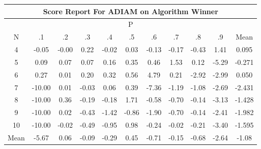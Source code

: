 \documentclass[11pt,a4paper]{report}
\begin{document}
\begin{longtable}{ | c || c | c | c | c | c | c | c | c | c || c |}
\hline
\multicolumn{11}{|c|}{ Score Report For ADIAM on Algorithm Winner} \\
\hline
\multicolumn{11}{|c|}{ P } \\
\hline
N & .1 & .2 & .3 & .4 & .5 & .6 & .7 & .8 & .9 & Mean\\
 \hline
 \hline
 \endhead
  4 &  \cellcolor[HTML]{FFFFFF} -0.05 &  \cellcolor[HTML]{FFFFFF} -0.00 &  \cellcolor[HTML]{F7F7FF} 0.22 &  \cellcolor[HTML]{FFFFFF} -0.02 &  \cellcolor[HTML]{FFFFFF} 0.03 &  \cellcolor[HTML]{FFFFFF} -0.13 &  \cellcolor[HTML]{FFF7F7} -0.17 &  \cellcolor[HTML]{FFF7F7} -0.43 &  \cellcolor[HTML]{DFDFFF} 1.41 & 0.095 \\
  5 &  \cellcolor[HTML]{FFFFFF} 0.09 &  \cellcolor[HTML]{FFFFFF} 0.07 &  \cellcolor[HTML]{FFFFFF} 0.07 &  \cellcolor[HTML]{F7F7FF} 0.16 &  \cellcolor[HTML]{F7F7FF} 0.35 &  \cellcolor[HTML]{F7F7FF} 0.46 &  \cellcolor[HTML]{D7D7FF} 1.53 &  \cellcolor[HTML]{FFFFFF} 0.12 &  \cellcolor[HTML]{FF7878} -5.29 & -0.271 \\
  6 &  \cellcolor[HTML]{F7F7FF} 0.27 &  \cellcolor[HTML]{FFFFFF} 0.01 &  \cellcolor[HTML]{F7F7FF} 0.20 &  \cellcolor[HTML]{F7F7FF} 0.32 &  \cellcolor[HTML]{EFEFFF} 0.56 &  \cellcolor[HTML]{8787FF} 4.79 &  \cellcolor[HTML]{F7F7FF} 0.21 &  \cellcolor[HTML]{FFB7B7} -2.92 &  \cellcolor[HTML]{FFB7B7} -2.99 & 0.050 \\
  7 &  \cellcolor[HTML]{FF0000} -10.00 &  \cellcolor[HTML]{FFFFFF} 0.01 &  \cellcolor[HTML]{FFFFFF} -0.03 &  \cellcolor[HTML]{FFFFFF} 0.06 &  \cellcolor[HTML]{F7F7FF} 0.39 &  \cellcolor[HTML]{FF4848} -7.36 &  \cellcolor[HTML]{FFDFDF} -1.19 &  \cellcolor[HTML]{FFE7E7} -1.08 &  \cellcolor[HTML]{FFBFBF} -2.69 & -2.431 \\
  8 &  \cellcolor[HTML]{FF0000} -10.00 &  \cellcolor[HTML]{F7F7FF} 0.36 &  \cellcolor[HTML]{FFF7F7} -0.19 &  \cellcolor[HTML]{FFF7F7} -0.18 &  \cellcolor[HTML]{D7D7FF} 1.71 &  \cellcolor[HTML]{FFEFEF} -0.58 &  \cellcolor[HTML]{FFEFEF} -0.70 &  \cellcolor[HTML]{FFFFFF} -0.14 &  \cellcolor[HTML]{FFAFAF} -3.13 & -1.428 \\
  9 &  \cellcolor[HTML]{FF0000} -10.00 &  \cellcolor[HTML]{FFFFFF} 0.02 &  \cellcolor[HTML]{FFF7F7} -0.43 &  \cellcolor[HTML]{FFDFDF} -1.42 &  \cellcolor[HTML]{FFE7E7} -0.86 &  \cellcolor[HTML]{FFCFCF} -1.90 &  \cellcolor[HTML]{FFEFEF} -0.70 &  \cellcolor[HTML]{FFFFFF} -0.14 &  \cellcolor[HTML]{FFBFBF} -2.41 & -1.982 \\
  10 &  \cellcolor[HTML]{FF0000} -10.00 &  \cellcolor[HTML]{FFFFFF} -0.02 &  \cellcolor[HTML]{FFEFEF} -0.49 &  \cellcolor[HTML]{FFE7E7} -0.95 &  \cellcolor[HTML]{E7E7FF} 0.98 &  \cellcolor[HTML]{FFF7F7} -0.24 &  \cellcolor[HTML]{FFFFFF} -0.02 &  \cellcolor[HTML]{FFF7F7} -0.21 &  \cellcolor[HTML]{FFA7A7} -3.40 & -1.595 \\
 \hline
 \hline
Mean &  \cellcolor[HTML]{FF7070} -5.67 &  \cellcolor[HTML]{FFFFFF} 0.06 &  \cellcolor[HTML]{FFFFFF} -0.09 &  \cellcolor[HTML]{FFF7F7} -0.29 &  \cellcolor[HTML]{F7F7FF} 0.45 &  \cellcolor[HTML]{FFEFEF} -0.71 &  \cellcolor[HTML]{FFFFFF} -0.15 &  \cellcolor[HTML]{FFEFEF} -0.68 &  \cellcolor[HTML]{FFBFBF} -2.64 &  \cellcolor[HTML]{FFE7E7} -1.08
\end{longtable}
\end{document}
